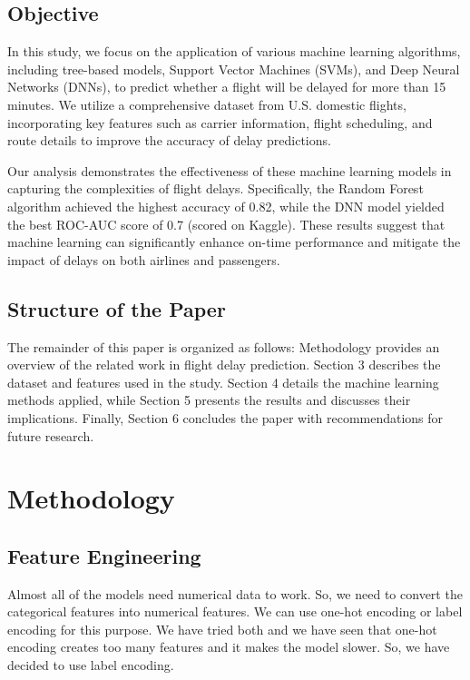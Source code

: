 \documentclass[conference]{IEEEtran}
\begin{document}
\subsection{Objective}
In this study, we focus on the application of various machine learning algorithms, including tree-based models, Support Vector Machines (SVMs), and Deep Neural Networks (DNNs), to predict whether a flight will be delayed for more than 15 minutes. We utilize a comprehensive dataset from U.S. domestic flights, incorporating key features such as carrier information, flight scheduling, and route details to improve the accuracy of delay predictions.

Our analysis demonstrates the effectiveness of these machine learning models in capturing the complexities of flight delays. Specifically, the Random Forest algorithm achieved the highest accuracy of 0.82, while the DNN model yielded the best ROC-AUC score of 0.7 (scored on Kaggle). These results suggest that machine learning can significantly enhance on-time performance and mitigate the impact of delays on both airlines and passengers.

\subsection{Structure of the Paper}
The remainder of this paper is organized as follows: Methodology provides an overview of the related work in flight delay prediction. Section 3 describes the dataset and features used in the study. Section 4 details the machine learning methods applied, while Section 5 presents the results and discusses their implications. Finally, Section 6 concludes the paper with recommendations for future research.



\section{Methodology}
\subsection{Feature Engineering}
Almost all of the models need numerical data to work. So, we need to convert the categorical features into numerical features. We can use one-hot encoding or label encoding for this purpose. We have tried both and we have seen that one-hot encoding creates too many features and it makes the model slower. So, we have decided to use label encoding.
\end{document}
